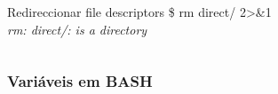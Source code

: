 \documentclass[t,notes=show]{beamer}
\begin{document}
\begin{frame}[fragile]
\begin{columns}
\begin{column}[t]{.5\textwidth}
{\begin{semiverbatim}
\begin{block}{Redireccionar file descriptors}
							\$ rm direct/ 2>\&1   \\
							\emph{rm: direct/: is a directory} \\
						\end{block}	
					\end{semiverbatim}
				}
			\end{column}
		\end{columns}			
	\end{frame}
	
	\begin{frame}
		\frametitle{Variáveis em BASH}
	\end{frame}	
		
\end{document}
